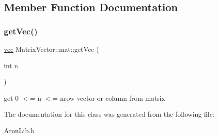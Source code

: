 \subsection{Member Function Documentation}
\mbox{\label{class_matrix_vector_1_1mat_af971b3b347cdb13e134824d386d2b605}} 
\subsubsection{\texorpdfstring{get\+Vec()}{getVec()}}
{\footnotesize\ttfamily \mbox{\hyperlink{class_matrix_vector_1_1vec}{vec}} Matrix\+Vector\+::mat\+::get\+Vec (\begin{DoxyParamCaption}\item[{int}]{n }\end{DoxyParamCaption})}

get 0 $<$= n $<$= nrow vector or column from matrix 

The documentation for this class was generated from the following file\+:\begin{DoxyCompactItemize}
\item 
Aron\+Lib.\+h\end{DoxyCompactItemize}
